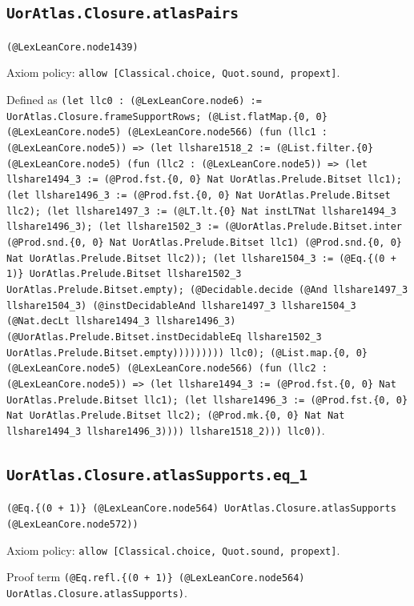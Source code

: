\documentclass[11pt]{article}
\begin{document}
\subsection*{\texttt{UorAtlas.Closure.atlasPairs}}
\noindent\texttt{(@LexLeanCore.node1439)}\par
\noindent Axiom policy: \texttt{allow [Classical.choice, Quot.sound, propext]}.\par
\noindent Defined as \texttt{(let llc0 : (@LexLeanCore.node6) := UorAtlas.Closure.frameSupportRows; (@List.flatMap.\{0, 0\} (@LexLeanCore.node5) (@LexLeanCore.node566) (fun (llc1 : (@LexLeanCore.node5)) => (let llshare1518\_2 := (@List.filter.\{0\} (@LexLeanCore.node5) (fun (llc2 : (@LexLeanCore.node5)) => (let llshare1494\_3 := (@Prod.fst.\{0, 0\} Nat UorAtlas.Prelude.Bitset llc1); (let llshare1496\_3 := (@Prod.fst.\{0, 0\} Nat UorAtlas.Prelude.Bitset llc2); (let llshare1497\_3 := (@LT.lt.\{0\} Nat instLTNat llshare1494\_3 llshare1496\_3); (let llshare1502\_3 := (@UorAtlas.Prelude.Bitset.inter (@Prod.snd.\{0, 0\} Nat UorAtlas.Prelude.Bitset llc1) (@Prod.snd.\{0, 0\} Nat UorAtlas.Prelude.Bitset llc2)); (let llshare1504\_3 := (@Eq.\{(0 + 1)\} UorAtlas.Prelude.Bitset llshare1502\_3 UorAtlas.Prelude.Bitset.empty); (@Decidable.decide (@And llshare1497\_3 llshare1504\_3) (@instDecidableAnd llshare1497\_3 llshare1504\_3 (@Nat.decLt llshare1494\_3 llshare1496\_3) (@UorAtlas.Prelude.Bitset.instDecidableEq llshare1502\_3 UorAtlas.Prelude.Bitset.empty))))))))) llc0); (@List.map.\{0, 0\} (@LexLeanCore.node5) (@LexLeanCore.node566) (fun (llc2 : (@LexLeanCore.node5)) => (let llshare1494\_3 := (@Prod.fst.\{0, 0\} Nat UorAtlas.Prelude.Bitset llc1); (let llshare1496\_3 := (@Prod.fst.\{0, 0\} Nat UorAtlas.Prelude.Bitset llc2); (@Prod.mk.\{0, 0\} Nat Nat llshare1494\_3 llshare1496\_3)))) llshare1518\_2))) llc0))}.\par
\subsection*{\texttt{UorAtlas.Closure.atlasSupports.eq\_1}}
\noindent\texttt{(@Eq.\{(0 + 1)\} (@LexLeanCore.node564) UorAtlas.Closure.atlasSupports (@LexLeanCore.node572))}\par
\noindent Axiom policy: \texttt{allow [Classical.choice, Quot.sound, propext]}.\par
\noindent Proof term \texttt{(@Eq.refl.\{(0 + 1)\} (@LexLeanCore.node564) UorAtlas.Closure.atlasSupports)}.\par
\end{document}

